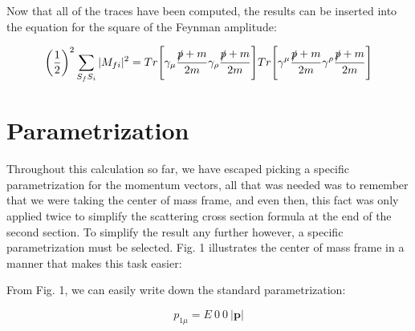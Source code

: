 \documentclass[a4]{article}
\begin{document}
    Now that all of the traces have been computed, the results can be inserted into the equation for the square of the Feynman amplitude:

    \begin{framed}
        \begin{eqnarray}
            \bigg( \frac{1}{2} \bigg)^2 \sum_{S_f S_i} |M_{f i}|^2 = Tr \Bigg[ \gamma_{\mu} \frac{\slashed{p} + m}{2m} \gamma_{\rho} \frac{\slashed{p} + m}{2m} \Bigg] Tr \Bigg[ \gamma^{\mu} \frac{\slashed{p} + m}{2m} \gamma^{\rho} \frac{\slashed{p} + m}{2m} \Bigg]
        \end{eqnarray}
    \end{framed}

    \section*{Parametrization}

    Throughout this calculation so far, we have escaped picking a specific parametrization for the momentum vectors, all that was needed was to remember that we were taking the center of mass frame, and even then, this fact was only applied twice to simplify
    the scattering cross section formula at the end of the second section. To simplify the result any further however, a specific parametrization must be selected. Fig. 1 illustrates the center of mass frame in a manner that makes this task easier:

    \begin{center}
    \end{center}

    From Fig. 1, we can easily write down the standard parametrization: 

    \begin{equation}
        p_{1 \mu} = E \: 0 \: 0 \: |\mathbf{p}|
    \end{equation}
    
\end{document}
